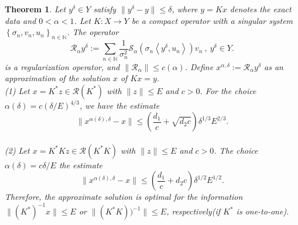 \documentclass[a4paper,12pt]{article}
\newtheorem{theorem}{Theorem}[section]
\numberwithin{equation}{section}
\begin{document}
\begin{theorem}\label{the3.9}
    Let $y^{\delta}\in Y$ satisfy $\|y^{\delta}-y\|\leq\delta$, where $y=Kx$ denotes the exact data and $0<\alpha < 1$. Let $K:X\rightarrow Y$ be a compact operator with a singular system $\left\{\sigma_{n},v_{n},u_{n}\right\}_{n\in\mathbb{N}}$. The operator
    \begin{equation*}
        \mathcal{R}_{\alpha}y^{\delta}:=\sum_{n\in\mathbb{N}}\frac{1}{\sigma_{n}^2}\mathcal{S}_{\alpha}(\sigma_{n}\left<y^{\delta}, u_{n}\right>)v_{n}\ ,\ y^{\delta}\in Y.
    \end{equation*}
    is a regularization operator, and $\left\|\mathcal{R}_{\alpha}\right\|\leq c\left(\alpha\right)$. Define $x^{\alpha,\delta}:=\mathcal{R}_{\alpha}y^{\delta}$ as an approximation of the solution $x$ of $Kx=y$. \\
    (1) Let $x=K^{*}z\in\mathcal{R}(K^{*})$ with $\|z\|\leq E$ and $c>0$. For the choice $\alpha(\delta)=c(\delta/E)^{4/3}$, we have the estimate
    \begin{equation}\label{equ3.18}
        \|x^{\alpha(\delta),\delta}-x\|\leq(\frac{d_{1}}{c}+\sqrt{d_{2}c})\delta^{1/3} E^{2/3}.
    \end{equation} \\
    (2) Let $x=K^{*}Kz\in\mathcal{R}(K^{*}K)$ with $\|z\|\leq E$ and $c>0$. The choice $\alpha(\delta)=c\delta/E$  the estimate
    \begin{equation}\label{equ3.19}
        \|x^{\alpha(\delta),\delta}-x\|\leq(\frac{d_{1}}{c}+d_{2}c)\delta^{1/2} E^{1/2}.
    \end{equation}
    Therefore, the approximate solution is optimal for the information $\|(K^{*})^{-1}x\|\leq E$ or $\|(K^{*}K))^{-1}\|\leq E$, respectively(if $K^{*}$ is one-to-one).
\end{theorem}
\end{document}
